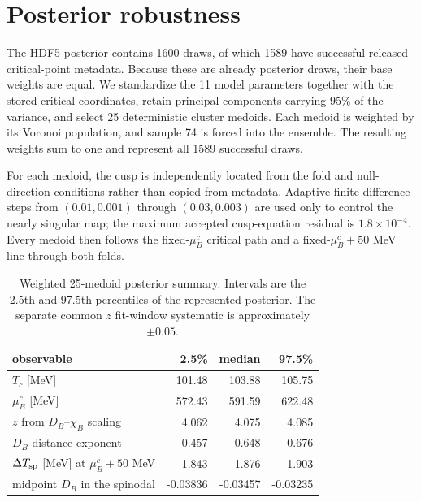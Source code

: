 \documentclass[11pt,a4paper]{article}
\newcommand{\mub}{\mu_B}
\begin{document}
\section{Posterior robustness}
\label{sec:posterior}

The HDF5 posterior contains 1600 draws, of which 1589 have successful released
critical-point metadata.  Because these are already posterior draws, their
base weights are equal.  We standardize the 11 model parameters together with
the stored critical coordinates, retain principal components carrying 95\% of
the variance, and select 25 deterministic cluster medoids.  Each medoid is
weighted by its Voronoi population, and sample 74 is forced into the ensemble.
The resulting weights sum to one and represent all 1589 successful draws.

For each medoid, the cusp is independently located from the fold and
null-direction conditions rather than copied from metadata.  Adaptive
finite-difference steps from $(0.01,0.001)$ through $(0.03,0.003)$ are used
only to control the nearly singular map; the maximum accepted cusp-equation
residual is $1.8\times10^{-4}$.  Every medoid then follows the fixed-$\mub^c$
critical path and a fixed-$\mub^c+50$ MeV line through both folds.

\begin{table}[t]
 \centering
 \caption{Weighted 25-medoid posterior summary.  Intervals are the 2.5th and
 97.5th percentiles of the represented posterior.  The separate common
 $z$ fit-window systematic is approximately $\pm0.05$.}
 \label{tab:posterior}
 \begin{tabular}{@{}lrrr@{}}
 \toprule
 observable & 2.5\% & median & 97.5\%\\
 \midrule
 $T_c$ [MeV] & 101.48 & 103.88 & 105.75\\
 $\mub^c$ [MeV] & 572.43 & 591.59 & 622.48\\
 $z$ from $D_B$--$\chi_B$ scaling & 4.062 & 4.075 & 4.085\\
 $D_B$ distance exponent & 0.457 & 0.648 & 0.676\\
 $\Delta T_{\rm sp}$ [MeV] at $\mub^c+50$ MeV & 1.843 & 1.876 & 1.903\\
 midpoint $D_B$ in the spinodal & -0.03836 & -0.03457 & -0.03235\\
 \bottomrule
 \end{tabular}
\end{table}
\end{document}
